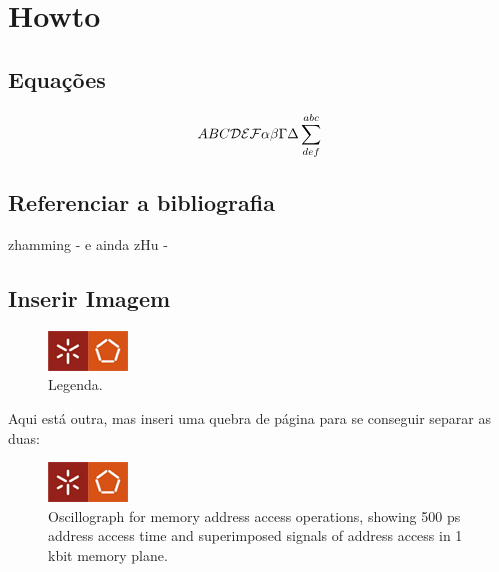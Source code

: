 \chapter[How to?]
{Howto}

\section{Equações}

\begin{equation}
ABC {\cal DEF} \alpha\beta\Gamma\Delta\sum^{abc}_{def}
\end{equation}


\section{Referenciar a bibliografia}

zhamming - \cite{hamming} e ainda zHu - \cite{zHu}

\section{Inserir Imagem}

\begin{figure}[ht]
\centerline{\includegraphics[width=.5\textwidth]{images/dium}}
\caption{Legenda.}
\end{figure}

\pagebreak

Aqui está outra, mas inseri uma quebra de página para se conseguir separar as duas:

\begin{figure}[ht]
\vskip2pt
\centerline{\includegraphics[width=.5\textwidth]{images/dium}}
\caption{Oscillograph for  memory address access operations,
showing 500 ps
address access time and superimposed signals
of address access in 1 kbit
memory plane.}
\end{figure}


